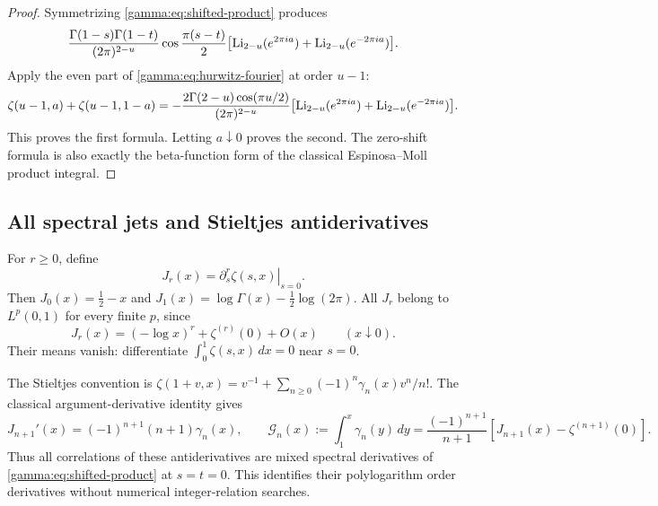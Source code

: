 \begin{proof}
Symmetrizing \eqref{gamma:eq:shifted-product} produces
\[
 \frac{\Gamma(1-s)\Gamma(1-t)}{(2\pi)^{2-u}}
 \cos\frac{\pi(s-t)}2
 \bigl[\operatorname{Li}_{2-u}(e^{2\pi ia})+\operatorname{Li}_{2-u}(e^{-2\pi ia})\bigr].
\]
Apply the even part of \eqref{gamma:eq:hurwitz-fourier} at order $u-1$:
\[
 \zeta(u-1,a)+\zeta(u-1,1-a)
 =-\frac{2\Gamma(2-u)\cos(\pi u/2)}{(2\pi)^{2-u}}
 \bigl[\operatorname{Li}_{2-u}(e^{2\pi ia})+\operatorname{Li}_{2-u}(e^{-2\pi ia})\bigr].
\]
This proves the first formula. Letting $a\downarrow0$ proves the second.
The zero-shift formula is also exactly the beta-function form of the
classical Espinosa--Moll product integral.
\end{proof}

\subsection{All spectral jets and Stieltjes antiderivatives}

For $r\ge0$, define
\begin{equation}
 J_r(x)=\left.\partial_s^r\zeta(s,x)\right|_{s=0}.
 \label{gamma:eq:J}
\end{equation}
Then $J_0(x)=\tfrac12-x$ and
$J_1(x)=\log\Gamma(x)-\tfrac12\log(2\pi)$.
All $J_r$ belong to $L^p(0,1)$ for every finite $p$, since
\begin{equation}
 J_r(x)=(-\log x)^r+\zeta^{(r)}(0)+O(x)
 \qquad(x\downarrow0).
 \label{gamma:eq:J-endpoint}
\end{equation}
Their means vanish: differentiate
$\int_0^1\zeta(s,x)\,dx=0$ near $s=0$.

The Stieltjes convention is
$\zeta(1+v,x)=v^{-1}+\sum_{n\ge0}(-1)^n\gamma_n(x)v^n/n!$.
The classical argument-derivative identity gives
\begin{equation}
 J_{n+1}'(x)=(-1)^{n+1}(n+1)\gamma_n(x),\qquad
 \mathcal G_n(x):=\int_1^x\gamma_n(y)\,dy
 =\frac{(-1)^{n+1}}{n+1}
       [J_{n+1}(x)-\zeta^{(n+1)}(0)].
 \label{gamma:eq:stieltjes-primitives}
\end{equation}
Thus all correlations of these antiderivatives are mixed spectral
derivatives of \eqref{gamma:eq:shifted-product} at $s=t=0$.
This identifies their polylogarithm order derivatives without numerical
integer-relation searches.

